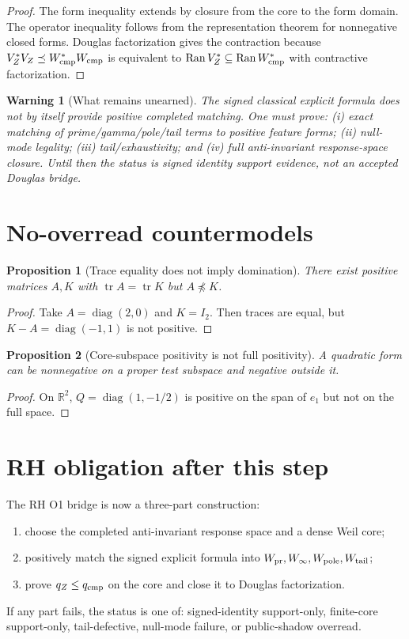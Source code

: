 \documentclass[11pt]{article}
\newtheorem{proposition}{Proposition}
\newtheorem{warning}{Warning}
\begin{document}
\begin{proof}
The form inequality extends by closure from the core to the form domain. The operator inequality follows from the representation theorem for nonnegative closed forms. Douglas factorization gives the contraction because $V_Z^*V_Z\preceq W_{\rm cmp}^*W_{\rm cmp}$ is equivalent to $\operatorname{Ran}V_Z^*\subseteq \operatorname{Ran}W_{\rm cmp}^*$ with contractive factorization.
\end{proof}

\begin{warning}[What remains unearned]
The signed classical explicit formula does not by itself provide positive completed matching. One must prove: (i) exact matching of prime/gamma/pole/tail terms to positive feature forms; (ii) null-mode legality; (iii) tail/exhaustivity; and (iv) full anti-invariant response-space closure. Until then the status is signed identity support evidence, not an accepted Douglas bridge.
\end{warning}

\section{No-overread countermodels}
\begin{proposition}[Trace equality does not imply domination]
There exist positive matrices $A,K$ with $\operatorname{tr}A=\operatorname{tr}K$ but $A\npreceq K$.
\end{proposition}
\begin{proof}
Take $A=\operatorname{diag}(2,0)$ and $K=I_2$. Then traces are equal, but $K-A=\operatorname{diag}(-1,1)$ is not positive.
\end{proof}

\begin{proposition}[Core-subspace positivity is not full positivity]
A quadratic form can be nonnegative on a proper test subspace and negative outside it.
\end{proposition}
\begin{proof}
On $\mathbb R^2$, $Q=\operatorname{diag}(1,-1/2)$ is positive on the span of $e_1$ but not on the full space.
\end{proof}

\section{RH obligation after this step}
The RH O1 bridge is now a three-part construction:
\begin{enumerate}
\item choose the completed anti-invariant response space and a dense Weil core;
\item positively match the signed explicit formula into $W_{\rm pr},W_\infty,W_{\rm pole},W_{\rm tail}$;
\item prove $q_Z\le q_{\rm cmp}$ on the core and close it to Douglas factorization.
\end{enumerate}
If any part fails, the status is one of: signed-identity support-only, finite-core support-only, tail-defective, null-mode failure, or public-shadow overread.
\end{document}
